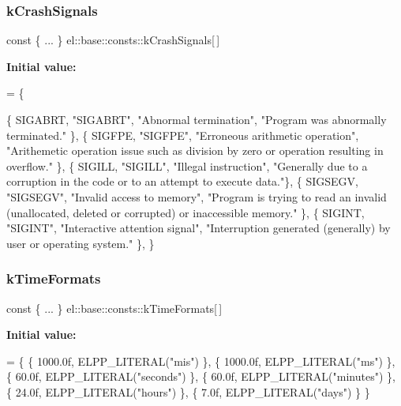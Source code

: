 \subsubsection{\texorpdfstring{k\+Crash\+Signals}{kCrashSignals}}
{\footnotesize\ttfamily const \{ ... \}   el\+::base\+::consts\+::k\+Crash\+Signals\mbox{[}$\,$\mbox{]}}

{\bfseries Initial value\+:}
\begin{DoxyCode}
= \{
        
        \{ SIGABRT, \textcolor{stringliteral}{"SIGABRT"}, \textcolor{stringliteral}{"Abnormal termination"},
                \textcolor{stringliteral}{"Program was abnormally terminated."} \},
        \{ SIGFPE, \textcolor{stringliteral}{"SIGFPE"}, \textcolor{stringliteral}{"Erroneous arithmetic operation"},
                \textcolor{stringliteral}{"Arithemetic operation issue such as division by zero or operation resulting in overflow."} 
      \},
        \{ SIGILL, \textcolor{stringliteral}{"SIGILL"}, \textcolor{stringliteral}{"Illegal instruction"},
                \textcolor{stringliteral}{"Generally due to a corruption in the code or to an attempt to execute data."}\},
        \{ SIGSEGV, \textcolor{stringliteral}{"SIGSEGV"}, \textcolor{stringliteral}{"Invalid access to memory"},
                \textcolor{stringliteral}{"Program is trying to read an invalid (unallocated, deleted or corrupted) or inaccessible
       memory."} \},
        \{ SIGINT, \textcolor{stringliteral}{"SIGINT"}, \textcolor{stringliteral}{"Interactive attention signal"},
                 \textcolor{stringliteral}{"Interruption generated (generally) by user or operating system."} \},
    \}
\end{DoxyCode}
\mbox{\label{namespaceel_1_1base_1_1consts_aebf5600a219b9313965789b468416edd}} 
\subsubsection{\texorpdfstring{k\+Time\+Formats}{kTimeFormats}}
{\footnotesize\ttfamily const \{ ... \}   el\+::base\+::consts\+::k\+Time\+Formats\mbox{[}$\,$\mbox{]}}

{\bfseries Initial value\+:}
\begin{DoxyCode}
= \{
       \{ 1000.0f, ELPP\_LITERAL(\textcolor{stringliteral}{"mis"}) \},
       \{ 1000.0f, ELPP\_LITERAL(\textcolor{stringliteral}{"ms"}) \},
       \{ 60.0f, ELPP\_LITERAL(\textcolor{stringliteral}{"seconds"}) \},
       \{ 60.0f, ELPP\_LITERAL(\textcolor{stringliteral}{"minutes"}) \},
       \{ 24.0f, ELPP\_LITERAL(\textcolor{stringliteral}{"hours"}) \},
       \{ 7.0f, ELPP\_LITERAL(\textcolor{stringliteral}{"days"}) \}
    \}
\end{DoxyCode}
